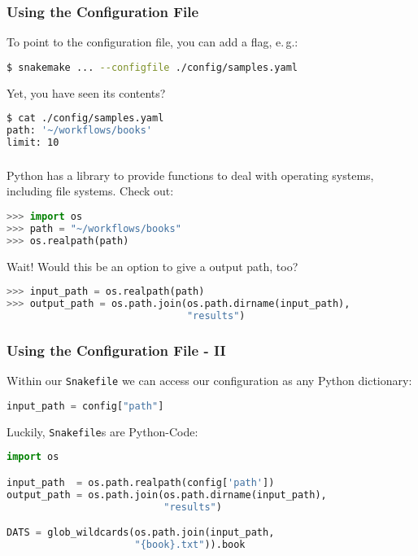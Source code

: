\begin{frame}[fragile]
  \frametitle{Using the Configuration File}
  To point to the configuration file, you can add a flag, e.\,g.:
  \begin{lstlisting}[language=Bash, style=Shell]
$ snakemake ... --configfile ./config/samples.yaml  
  \end{lstlisting}
  Yet, you have seen its contents?
  \begin{lstlisting}[language=Bash, style=Shell]
$ cat ./config/samples.yaml
path: '~/workflows/books'
limit: 10
  \end{lstlisting}
\end{frame} 

\begin{frame}[fragile]
  \frametitle{}
  Python has a library to provide functions to deal with operating systems, including file systems. Check out:
  \begin{lstlisting}[language=Python,style=Python]
>>> import os
>>> path = "~/workflows/books"
>>> os.realpath(path)
  \end{lstlisting}
  \pause
  Wait! Would this be an option to give a output path, too?
  \begin{lstlisting}[language=Python,style=Python,basicstyle=\footnotesize]
>>> input_path = os.realpath(path)
>>> output_path = os.path.join(os.path.dirname(input_path),
                               "results")
  \end{lstlisting}
  \vfill
\end{frame}


\begingroup
{}
\begin{frame}[fragile]
  \frametitle{Using the Configuration File - II}
  Within our \texttt{Snakefile} we can access our configuration as any Python dictionary:
  \begin{lstlisting}[language=Python,style=Python]
input_path = config["path"]
  \end{lstlisting}
  \pause
  Luckily, \texttt{Snakefile}s are Python-Code:
  \begin{lstlisting}[language=Python,style=Python]
import os

input_path  = os.path.realpath(config['path'])
output_path = os.path.join(os.path.dirname(input_path),
                           "results")

DATS = glob_wildcards(os.path.join(input_path, 
                      "{book}.txt")).book
  \end{lstlisting}
\end{frame}
\endgroup

